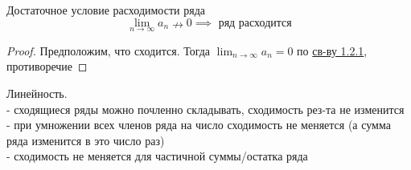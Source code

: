 \begin{sv}
    Достаточное условие расходимости ряда 
    \begin{equation}
        \lim_{n\to\infty} a_{n} \nrightarrow 0 
        \implies \text{ ряд расходится}
    \end{equation}
    \begin{proof}
        Предположим, что сходится. 
        Тогда \(\lim_{n\to\infty} a_{n} = 0\) по \hyperlink{sv:neob}{св-ву 1.2.1}, противоречие
    \end{proof}
\end{sv}

\begin{sv}
    Линейность. \\
    - сходящиеся ряды можно почленно складывать, сходимость рез-та не изменится\\
    - при умножении всех членов ряда на число сходимость не меняется (а сумма ряда изменится в это число раз)\\
    - сходимость не меняется для частичной суммы/остатка ряда
\end{sv}

